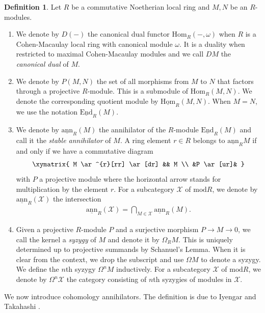 \documentclass[12pt]{amsart}
\newcommand{\Hom}{\mathrm{Hom}}
\newcommand{\sHom}{\underline{\mathrm{Hom}}}
\newcommand{\sEnd}{\underline{\mathrm{End}}}
\newcommand{\sann}{\underline{\mathrm{ann}}}
\newcommand{\module}{\mathrm{mod}}
\newcommand{\XX}{\mathcal{X}}
\theoremstyle{definition}
\newtheorem{definition}[theorem]{Definition}
\numberwithin{equation}{theorem}
\begin{document}
\begin{definition}\label{general-definitions}
    Let $R$ be a commutative Noetherian local ring and $M,N$ be an $R$-modules. 
    \begin{enumerate}
        \item We denote by $D(-)$ the canonical dual functor $\Hom_R(-,\omega)$ when $R$ is a Cohen-Macaulay local ring with canonical module $\omega$. It is a duality when restricted to maximal Cohen-Macaulay modules and we call $DM$ the \textit{canonical dual} of $M$.
        \item We denote by $P(M,N)$ the set of all morphisms from $M$ to $N$ that factors through a projective $R$-module. This is a submodule of $\Hom_R(M,N)$. We denote the corresponding quotient module by $\sHom_R(M,N)$. When $M = N$, we use the notation $\sEnd_R(M)$.
        \item We denote by $\sann_R(M)$ the annihilator of the $R$-module $\sEnd_R(M)$ and call it the \textit{stable annihilator} of $M$. A ring element $r \in R$ belongs to $\sann_R M$ if and only if we have a commutative diagram
            \begin{align*}
                \xymatrix{
                M \ar^{r}[rr] \ar[dr]  && M \\
                &P \ar[ur]&
                }
            \end{align*}
            with $P$ a projective module where the horizontal arrow stands for multiplication by the element $r$. For a subcategory $\XX$ of $\module R$, we denote by $\sann_R(\XX)$ the intersection 
            \begin{align*}
            \sann_R(\XX) = \bigcap_{M \in \XX} \sann_R(M).
            \end{align*}
        \item Given a projective $R$-module $P$ and a surjective morphism $P \to M \to 0$, we call the kernel a \textit{syzygy} of $M$ and denote it by $\Omega_R M$. This is uniquely determined up to projective summands by Schanuel's Lemma. When it is clear from the context, we drop the subscript and use $\Omega M$ to denote a syzygy. We define the $n$th syzygy $\Omega^n M$ inductively. For a subcategory $\XX$ of $\module R$, we denote by $\Omega^n \XX$ the category consisting of $n$th syzygies of modules in $\XX$. 
    \end{enumerate}
\end{definition}
We now introduce cohomology annihilators. The definition is due to Iyengar and Takahashi \cite{iyengar-takahashi}.
\end{document}
